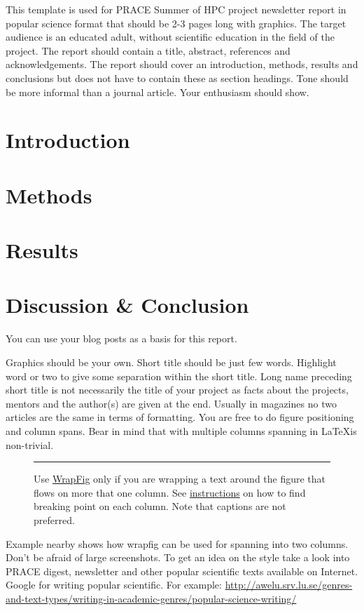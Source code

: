 \documentclass[a4paper, twoside]{article}
\newcommand{\highlight}[1]{\textcolor{prace-orange}{#1}}
\begin{document}
\begin{multicols}{3}

\lettrine[lines=4,nindent=0em]{\highlight{T}}{}his template is used for
PRACE Summer of HPC project newsletter report in popular science format that should be 2-3 pages long with graphics. The target audience is an educated adult, without scientific education in the field of the project. The report should contain a title, abstract, references and acknowledgements. 
\vspace{13\baselineskip} %
The report should cover an introduction, methods, results and conclusions but does not have to contain these as section headings. Tone should be more informal than a journal article. Your enthusiasm should show.

\section{Introduction}
\section{Methods}
\section{Results}
\section{Discussion \& Conclusion}

You can use your blog posts as a basis for this report. 

Graphics should be your own. Short title should be just few words. Highlight word or two to give some separation within the short title. Long name preceding short title is not necessarily the title of your project as facts about the projects, mentors and the author(s) are given at the end. Usually in magazines no two articles are the same in terms of formatting. You are free to do figure positioning and column spans. Bear in mind that with multiple columns spanning in \LaTeX is non-trivial.
\begin{figure}
  \color{yellow}\rule{\linewidth}{3cm}\color{black}
  \caption{Use \href{http://www.ctan.org/pkg/wrapfig}{WrapFig} only if you are wrapping a text around the figure that flows on more that one column. See \href{http://ctan.ijs.si/tex-archive/macros/latex/contrib/wrapfig/multiple-span.txt}{instructions} on how to find breaking point on each column. Note that captions are not preferred.}
  \label{fig:myfig1}
\end{figure}
\noindent Example nearby shows how wrapfig can be used for spanning into two columns. Don't be afraid of large screenshots. To get an idea on the style take a look into PRACE digest, newsletter and other popular scientific texts available on Internet. Google for \highlight{writing popular scientific}. For example: \url{http://awelu.srv.lu.se/genres-and-text-types/writing-in-academic-genres/popular-science-writing/}


\end{multicols}
\end{document}

